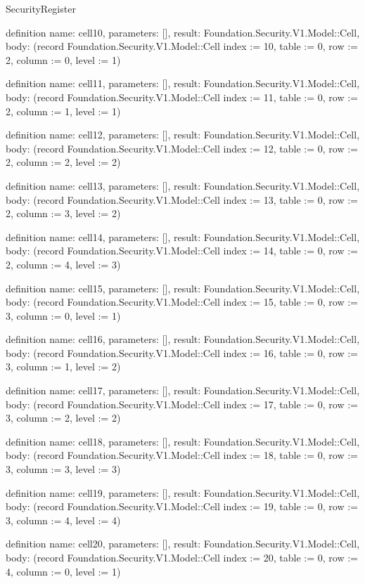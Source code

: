 \begin{lexlean}{SecurityRegister}
\begin{semanticmodule}
definition{
  name: cell10,
  parameters: [],
  result: Foundation.Security.V1.Model::Cell,
  body: (record Foundation.Security.V1.Model::Cell {index := 10, table := 0, row := 2, column := 0, level := 1})
}

definition{
  name: cell11,
  parameters: [],
  result: Foundation.Security.V1.Model::Cell,
  body: (record Foundation.Security.V1.Model::Cell {index := 11, table := 0, row := 2, column := 1, level := 1})
}

definition{
  name: cell12,
  parameters: [],
  result: Foundation.Security.V1.Model::Cell,
  body: (record Foundation.Security.V1.Model::Cell {index := 12, table := 0, row := 2, column := 2, level := 2})
}

definition{
  name: cell13,
  parameters: [],
  result: Foundation.Security.V1.Model::Cell,
  body: (record Foundation.Security.V1.Model::Cell {index := 13, table := 0, row := 2, column := 3, level := 2})
}

definition{
  name: cell14,
  parameters: [],
  result: Foundation.Security.V1.Model::Cell,
  body: (record Foundation.Security.V1.Model::Cell {index := 14, table := 0, row := 2, column := 4, level := 3})
}

definition{
  name: cell15,
  parameters: [],
  result: Foundation.Security.V1.Model::Cell,
  body: (record Foundation.Security.V1.Model::Cell {index := 15, table := 0, row := 3, column := 0, level := 1})
}

definition{
  name: cell16,
  parameters: [],
  result: Foundation.Security.V1.Model::Cell,
  body: (record Foundation.Security.V1.Model::Cell {index := 16, table := 0, row := 3, column := 1, level := 2})
}

definition{
  name: cell17,
  parameters: [],
  result: Foundation.Security.V1.Model::Cell,
  body: (record Foundation.Security.V1.Model::Cell {index := 17, table := 0, row := 3, column := 2, level := 2})
}

definition{
  name: cell18,
  parameters: [],
  result: Foundation.Security.V1.Model::Cell,
  body: (record Foundation.Security.V1.Model::Cell {index := 18, table := 0, row := 3, column := 3, level := 3})
}

definition{
  name: cell19,
  parameters: [],
  result: Foundation.Security.V1.Model::Cell,
  body: (record Foundation.Security.V1.Model::Cell {index := 19, table := 0, row := 3, column := 4, level := 4})
}

definition{
  name: cell20,
  parameters: [],
  result: Foundation.Security.V1.Model::Cell,
  body: (record Foundation.Security.V1.Model::Cell {index := 20, table := 0, row := 4, column := 0, level := 1})
}


\end{semanticmodule}
\end{lexlean}
